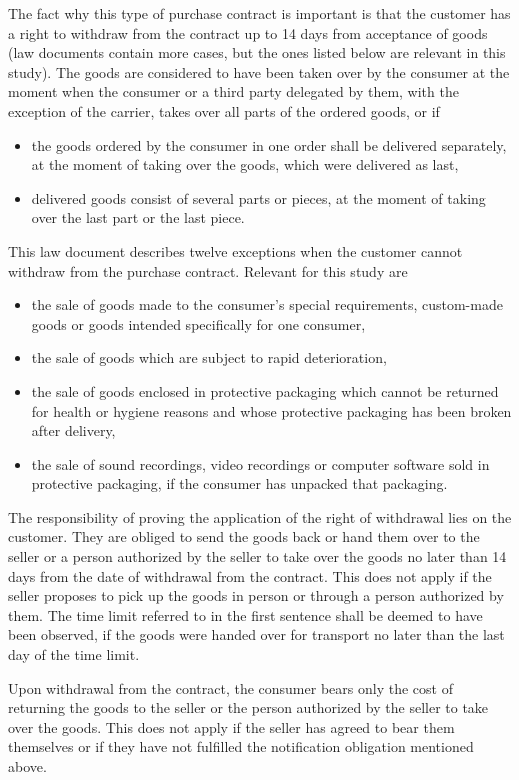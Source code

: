 \documentclass[thesis=M,english]{FITthesis}[2019/12/23]
\begin{document}
The fact why this type of purchase contract is important is that the customer has a right to withdraw from the contract up to 14 days from acceptance of goods (law documents contain more cases, but the ones listed below are relevant in this study). The goods are considered to have been taken over by the consumer at the moment when the consumer or a third party delegated by them, with the exception of the carrier, takes over all parts of the ordered goods, or if
\begin{itemize}
\item the goods ordered by the consumer in one order shall be delivered separately, at the moment of taking over the goods, which were delivered as last,
\item delivered goods consist of several parts or pieces, at the moment of taking over the last part or the last piece.
\end{itemize}
This law document describes twelve exceptions when the customer cannot withdraw from the purchase contract. Relevant for this study are
\begin{itemize}
\item the sale of goods made to the consumer's special requirements, custom-made goods or goods intended specifically for one consumer,
\item the sale of goods which are subject to rapid deterioration,
\item the sale of goods enclosed in protective packaging which cannot be returned for health or hygiene reasons and whose protective packaging has been broken after delivery,
\item the sale of sound recordings, video recordings or computer software sold in protective packaging, if the consumer has unpacked that packaging.
\end{itemize}

The responsibility of proving the application of the right of withdrawal lies on the customer. They are obliged to send the goods back or hand them over to the seller or a person authorized by the seller to take over the goods no later than 14 days from the date of withdrawal from the contract. This does not apply if the seller proposes to pick up the goods in person or through a person authorized by them. The time limit referred to in the first sentence shall be deemed to have been observed, if the goods were handed over for transport no later than the last day of the time limit.

Upon withdrawal from the contract, the consumer bears only the cost of returning the goods to the seller or the person authorized by the seller to take over the goods. This does not apply if the seller has agreed to bear them themselves or if they have not fulfilled the notification obligation mentioned above.
\end{document}
